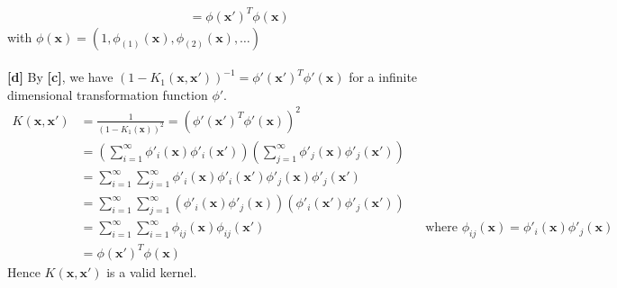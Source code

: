 \documentclass{article}
\begin{document}
\begin{CJK*}{UTF8}{bsmi}
\begin{normalsize}
\begin{enumerate}[label=\textbf{\arabic*}.]
\begin{align*}
            &= \phi(\mathbf{x'})^T \phi(\mathbf{x})
        \end{align*}
        with $\phi(\mathbf{x}) = (1, \phi_{(1)}(\mathbf{x}), \phi_{(2)}(\mathbf{x}), \dots)$\\\\
        \textbf{[d]} By \textbf{[c]}, we have $(1-K_1(\mathbf{x}, \mathbf{x'}))^{-1} = {\phi'(\mathbf{x'})}^T\phi'(\mathbf{x})$ for a infinite dimensional transformation function $\phi'$.
        \begin{align*}
            K(\mathbf{x}, \mathbf{x'}) &= \frac{1}{(1-K_1(\mathbf{x}))^2} = \left({\phi'(\mathbf{x'})}^T\phi'(\mathbf{x})\right)^2\\
            &= \left(\sum_{i=1}^\infty \phi'_i(\mathbf{x})\phi'_i(\mathbf{x'})\right)\left(\sum_{j=1}^\infty \phi'_j(\mathbf{x})\phi'_j(\mathbf{x'})\right)\\
            &= \sum_{i=1}^\infty\sum_{j=1}^\infty \phi'_i(\mathbf{x})\phi'_i(\mathbf{x'})\phi'_j(\mathbf{x})\phi'_j(\mathbf{x'})\\
            &= \sum_{i=1}^\infty \sum_{j=1}^\infty \left(\phi'_i(\mathbf{x})\phi'_j(\mathbf{x})\right) \left(\phi'_i(\mathbf{x'})\phi'_j(\mathbf{x'})\right)\\
            &= \sum_{i=1}^\infty \sum_{i=1}^\infty \phi_{ij}(\mathbf{x})\phi_{ij}(\mathbf{x'}) && \text{where $\phi_{ij}(\mathbf{x}) = \phi'_i(\mathbf{x})\phi'_j(\mathbf{x})$ }\\
            &= \phi(\mathbf{x'})^T\phi(\mathbf{x})
        \end{align*}
        Hence $K(\mathbf{x}, \mathbf{x'})$ is a valid kernel.
        

\end{enumerate}
\end{normalsize}
\end{CJK*}
\end{document}
